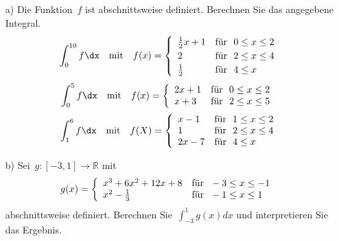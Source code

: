 \begin{itemize}
	\item[a)] Die Funktion~$f$ ist abschnittsweise definiert. Berechnen Sie das angegebene Integral.
		\begin{equation*}
			\int_{0}^{10} f \dx \quad \textnormal{mit} \quad f(x)=\left\{\renewcommand{\arraystretch}{1.2}\begin{array}{ll}
			\frac{1}{2} x+1 & \textnormal{für}~~ 0 \leq x \leq 2\\
			2				& \textnormal{für}~~ 2 \leq x \leq 4\\
			\frac{1}{2}		& \textnormal{für}~~ 4 \leq x\\
			\end{array}\right.
		\end{equation*}
		\begin{equation*}
			\int_{0}^{5} f \dx \quad \textnormal{mit} \quad f(x)=\left\{
			\begin{array}{ll}
			2x+1	& \textnormal{für}~~ 0\leq x \leq 2\\
			x+3		& \textnormal{für}~~ 2\leq x \leq 5
			\end{array}\right.\
		\end{equation*}
		\begin{equation*}
			\int_{1}^{6} f \dx \quad \textnormal{mit} \quad f(X)=\left\{
			\begin{array}{ll}
			x-1	& \textnormal{für}~~ 1 \leq x \leq 2\\
			1	& \textnormal{für}~~ 2 \leq x \leq 4\\
			2x-7& \textnormal{für}~~ 4 \leq x
			\end{array}\right.
		\end{equation*}
	\item[b)] Sei~$g:\left[-3,1\right] \to \mathbb{R}$ mit
	\begin{equation*}
		g(x)=\left\{
		\begin{array}{ll}
		x^3 + 6x^2 + 12x + 8 & \textnormal{für}~~ -3\leq x \leq -1\\
		x^2 -\frac{1}{3} & \textnormal{für}~~ -1\leq x \leq 1
		\end{array}\right.\
	\end{equation*}
	abschnittsweise definiert. Berechnen Sie~$\int_{-3}^{1}g(x)dx$ und interpretieren Sie das Ergebnis.
		\renewcommand{\arraystretch}{1.0}
\end{itemize}

